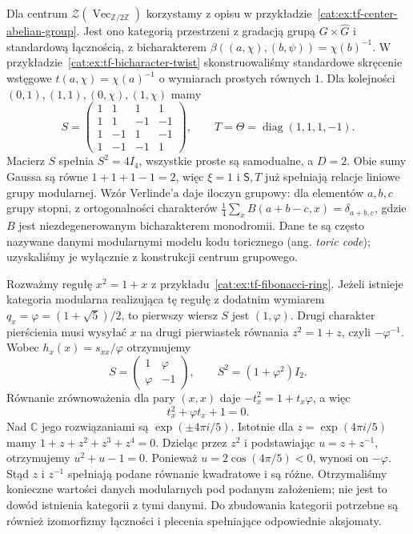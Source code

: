 \begin{przyklad}\label{cat:ex:tf-modular-toric}
Dla centrum $\mathcal Z(\operatorname{Vec}_{\mathbb Z/2\mathbb Z})$ korzystamy z opisu w przykładzie~\ref{cat:ex:tf-center-abelian-group}. Jest ono kategorią przestrzeni z gradacją grupą $G\times\widehat G$ i standardową łącznością, z bicharakterem $\beta((a,\chi),(b,\psi))=\chi(b)^{-1}$. W przykładzie~\ref{cat:ex:tf-bicharacter-twist} skonstruowaliśmy standardowe skręcenie wstęgowe $t(a,\chi)=\chi(a)^{-1}$ o wymiarach prostych równych $1$. Dla kolejności $(0,1),(1,1),(0,\chi),(1,\chi)$ mamy
\[
 S=\begin{pmatrix}
 1&1&1&1\\
 1&1&-1&-1\\
 1&-1&1&-1\\
 1&-1&-1&1
 \end{pmatrix},
 \qquad T=\Theta=\operatorname{diag}(1,1,1,-1).
\]
Macierz $S$ spełnia $S^2=4I_4$, wszystkie proste są samodualne, a $D=2$. Obie sumy Gaussa są równe $1+1+1-1=2$, więc $\xi=1$ i $\mathsf S,T$ już spełniają relacje liniowe grupy modularnej. Wzór Verlinde'a daje iloczyn grupowy: dla elementów $a,b,c$ grupy stopni, z ortogonalności charakterów $\tfrac14\sum_x B(a+b-c,x)=\delta_{a+b,c}$, gdzie $B$ jest niezdegenerowanym bicharakterem monodromii. Dane te są często nazywane danymi modularnymi modelu kodu toricznego (ang. \emph{toric code}); uzyskaliśmy je wyłącznie z konstrukcji centrum grupowego.
\end{przyklad}

\begin{przyklad}\label{cat:ex:tf-modular-fibonacci-formal}
Rozważmy regułę $x^2=1+x$ z przykładu~\ref{cat:ex:tf-fibonacci-ring}. Jeżeli istnieje kategoria modularna realizująca tę regułę z dodatnim wymiarem $q_x=\varphi=(1+\sqrt5)/2$, to pierwszy wiersz $S$ jest $(1,\varphi)$. Drugi charakter pierścienia musi wysyłać $x$ na drugi pierwiastek równania $z^2=1+z$, czyli $-\varphi^{-1}$. Wobec $h_x(x)=s_{xx}/\varphi$ otrzymujemy
\[
 S=\begin{pmatrix}1&\varphi\\\varphi&-1\end{pmatrix},
 \qquad S^2=(1+\varphi^2)I_2.
\]
Równanie zrównoważenia dla pary $(x,x)$ daje $-t_x^2=1+t_x\varphi$, a więc
\[
 t_x^2+\varphi t_x+1=0.
\]
Nad $\mathbb C$ jego rozwiązaniami są $\exp(\pm4\pi i/5)$. Istotnie dla $z=\exp(4\pi i/5)$ mamy $1+z+z^2+z^3+z^4=0$. Dzieląc przez $z^2$ i podstawiając $u=z+z^{-1}$, otrzymujemy $u^2+u-1=0$. Ponieważ $u=2\cos(4\pi/5)<0$, wynosi on $-\varphi$. Stąd $z$ i $z^{-1}$ spełniają podane równanie kwadratowe i są różne. Otrzymaliśmy konieczne wartości danych modularnych pod podanym założeniem; nie jest to dowód istnienia kategorii z tymi danymi. Do zbudowania kategorii potrzebne są również izomorfizmy łączności i plecenia spełniające odpowiednie aksjomaty.
\end{przyklad}

